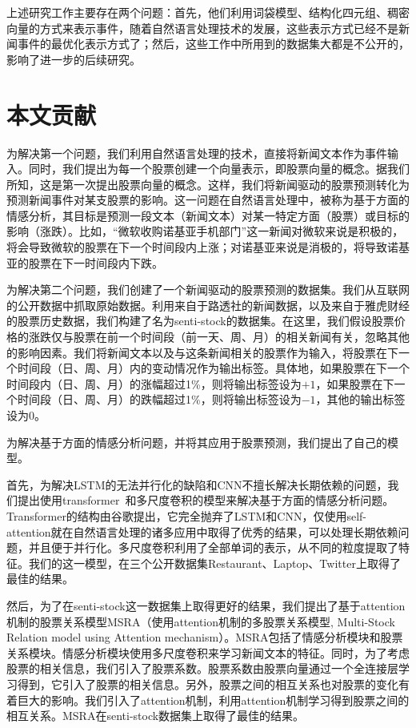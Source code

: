上述研究工作主要存在两个问题：首先，他们利用词袋模型、结构化四元组、稠密向量的方式来表示事件，随着自然语言处理技术的发展，这些表示方式已经不是新闻事件的最优化表示方式了；然后，这些工作中所用到的数据集大都是不公开的，影响了进一步的后续研究。

\section{本文贡献}

为解决第一个问题，我们利用自然语言处理的技术，直接将新闻文本作为事件输入。同时，我们提出为每一个股票创建一个向量表示，即股票向量的概念。据我们所知，这是第一次提出股票向量的概念。这样，我们将新闻驱动的股票预测转化为预测新闻事件对某支股票的影响。这一问题在自然语言处理中，被称为基于方面的情感分析，其目标是预测一段文本（新闻文本）对某一特定方面（股票）或目标的影响（涨跌）。比如，“微软收购诺基亚手机部门”这一新闻对微软来说是积极的，将会导致微软的股票在下一个时间段内上涨；对诺基亚来说是消极的，将导致诺基亚的股票在下一时间段内下跌。

为解决第二个问题，我们创建了一个新闻驱动的股票预测的数据集。我们从互联网的公开数据中抓取原始数据。利用来自于路透社的新闻数据，以及来自于雅虎财经的股票历史数据，我们构建了名为senti-stock的数据集。在这里，我们假设股票价格的涨跌仅与股票在前一个时间段（前一天、周、月）的相关新闻有关，忽略其他的影响因素。我们将新闻文本以及与这条新闻相关的股票作为输入，将股票在下一个时间段（日、周、月）内的变动情况作为输出标签。具体地，如果股票在下一个时间段内（日、周、月）的涨幅超过1\%，则将输出标签设为$+1$，如果股票在下一个时间段（日、周、月）的跌幅超过1\%，则将输出标签设为$-1$，其他的输出标签设为$0$。

为解决基于方面的情感分析问题，并将其应用于股票预测，我们提出了自己的模型。

首先，为解决LSTM的无法并行化的缺陷和CNN不擅长解决长期依赖的问题，我们提出使用transformer~\cite{NIPS2017_7181}和多尺度卷积的模型来解决基于方面的情感分析问题。Transformer的结构由谷歌提出，它完全抛弃了LSTM和CNN，仅使用self-attention就在自然语言处理的诸多应用中取得了优秀的结果，可以处理长期依赖问题，并且便于并行化。多尺度卷积利用了全部单词的表示，从不同的粒度提取了特征。我们的这一模型，在三个公开数据集Restaurant、Laptop、Twitter上取得了最佳的结果。

然后，为了在senti-stock这一数据集上取得更好的结果，我们提出了基于attention机制的股票关系模型MSRA（使用attention机制的多股票关系模型, Multi-Stock Relation model using Attention mechanism）。MSRA包括了情感分析模块和股票关系模块。情感分析模块使用多尺度卷积来学习新闻文本的特征。同时，为了考虑股票的相关信息，我们引入了股票系数。股票系数由股票向量通过一个全连接层学习得到，它引入了股票的相关信息。另外，股票之间的相互关系也对股票的变化有着巨大的影响。我们引入了attention机制，利用attention机制学习得到股票之间的相互关系。MSRA在senti-stock数据集上取得了最佳的结果。

